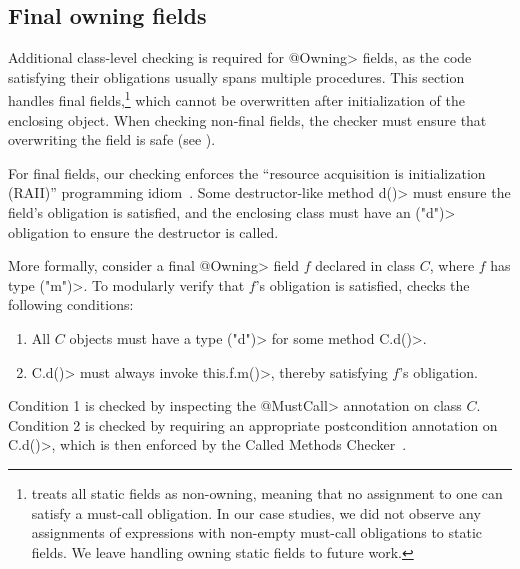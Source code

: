 

\subsection{Final owning fields}
\label{sec:owning-fields}

  Additional class-level checking is required for \<@Owning>
  fields, as the code
  satisfying their \MustCall obligations usually spans multiple
  procedures.  This section handles final fields,\footnote{\Tool
    treats all static fields as non-owning, meaning that no assignment to one
    can satisfy a must-call obligation. In our case studies, we did
    not observe any assignments of expressions with non-empty must-call obligations
    to static fields. We leave handling owning static fields to future work.
  }
  which cannot be overwritten after initialization of the enclosing
  object.  When checking
  non-final fields, the checker must ensure
  that overwriting the field is safe
  (see ).

  For final fields, our checking enforces the ``resource acquisition is
  initialization (RAII)'' programming idiom~\cite{raii}.  Some
  destructor-like method \<d()> must ensure the field's \MustCall obligation is
  satisfied, and the enclosing class must have an \MustCall\<("d")> obligation to
  ensure the destructor is called.

  More formally, consider a final \<@Owning> field $f$ declared in class $C$,
  where
  $f$ has type \MustCall\<("m")>.  To modularly
  verify that $f$'s \MustCall obligation is satisfied, \tool checks the following
  conditions:
  \begin{enumerate}
    \item All $C$ objects must have a type \MustCall\<("d")> for some method \<C.d()>.
    \item \<C.d()> must always invoke \<this.f.m()>, thereby satisfying $f$'s
    \MustCall obligation.
  \end{enumerate}
  Condition 1 is checked by inspecting the \<@MustCall> annotation on class $C$.
  Condition 2 is checked by requiring an appropriate \EnsuresCalledMethods
  postcondition annotation on \<C.d()>, which is then enforced by the Called
  Methods Checker~\cite{KelloggRSSE2020}.



